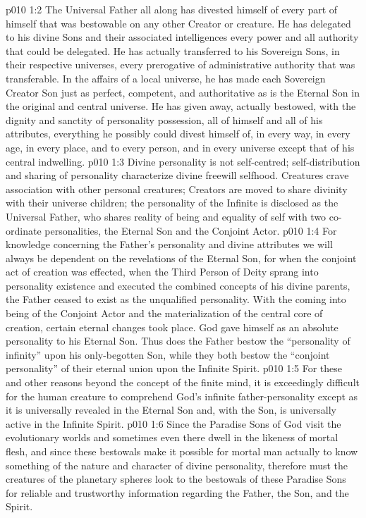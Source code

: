 \vs p010 1:2 The Universal Father all along has divested himself of every part of himself that was bestowable on any other Creator or creature. He has delegated to his divine Sons and their associated intelligences every power and all authority that could be delegated. He has actually transferred to his Sovereign Sons, in their respective universes, every prerogative of administrative authority that was transferable. In the affairs of a local universe, he has made each Sovereign Creator Son just as perfect, competent, and authoritative as is the Eternal Son in the original and central universe. He has given away, actually bestowed, with the dignity and sanctity of personality possession, all of himself and all of his attributes, everything he possibly could divest himself of, in every way, in every age, in every place, and to every person, and in every universe except that of his central indwelling.
\vs p010 1:3 \pc Divine personality is not self\hyp{}centred; self\hyp{}distribution and sharing of personality characterize divine freewill selfhood. Creatures crave association with other personal creatures; Creators are moved to share divinity with their universe children; the personality of the Infinite is disclosed as the Universal Father, who shares reality of being and equality of self with two co\hyp{}ordinate personalities, the Eternal Son and the Conjoint Actor.
\vs p010 1:4 \pc For knowledge concerning the Father’s personality and divine attributes we will always be dependent on the revelations of the Eternal Son, for when the conjoint act of creation was effected, when the Third Person of Deity sprang into personality existence and executed the combined concepts of his divine parents, the Father ceased to exist as the unqualified personality. With the coming into being of the Conjoint Actor and the materialization of the central core of creation, certain eternal changes took place. God gave himself as an absolute personality to his Eternal Son. Thus does the Father bestow the “personality of infinity” upon his only\hyp{}begotten Son, while they both bestow the “conjoint personality” of their eternal union upon the Infinite Spirit.
\vs p010 1:5 For these and other reasons beyond the concept of the finite mind, it is exceedingly difficult for the human creature to comprehend God’s infinite father\hyp{}personality except as it is universally revealed in the Eternal Son and, with the Son, is universally active in the Infinite Spirit.
\vs p010 1:6 Since the Paradise Sons of God visit the evolutionary worlds and sometimes even there dwell in the likeness of mortal flesh, and since these bestowals make it possible for mortal man actually to know something of the nature and character of divine personality, therefore must the creatures of the planetary spheres look to the bestowals of these Paradise Sons for reliable and trustworthy information regarding the Father, the Son, and the Spirit.
